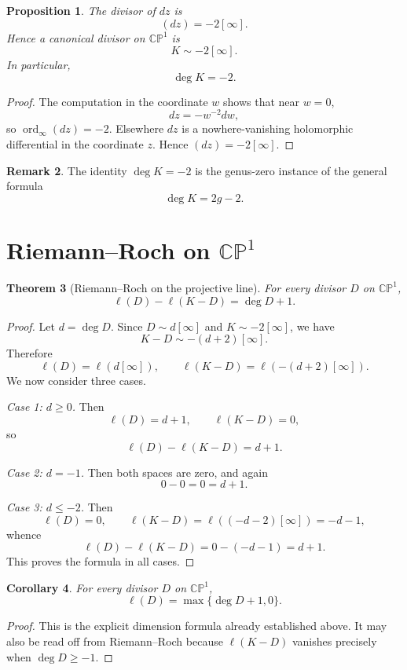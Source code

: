 \documentclass[11pt]{article}
\newcommand{\CP}{\mathbb{CP}}
\newcommand{\ord}{\operatorname{ord}}
\newcommand{\degd}{\operatorname{deg}}
\newcommand{\CPone}{\CP^1}
\newcommand{\ellD}{\ell}
\theoremstyle{plain}
\newtheorem{theorem}{Theorem}[section]
\newtheorem{proposition}[theorem]{Proposition}
\newtheorem{corollary}[theorem]{Corollary}
\theoremstyle{definition}
\newtheorem{remark}[theorem]{Remark}
\begin{document}
\begin{proposition}
The divisor of $dz$ is
\[
(dz)=-2[\infty].
\]
Hence a canonical divisor on $\CPone$ is
\[
K\sim -2[\infty].
\]
In particular,
\[
\degd K=-2.
\]
\end{proposition}

\begin{proof}
The computation in the coordinate $w$ shows that near $w=0$,
\[
dz=-w^{-2}dw,
\]
so $\ord_{\infty}(dz)=-2$. Elsewhere $dz$ is a nowhere-vanishing holomorphic differential in the coordinate $z$. Hence $(dz)=-2[\infty]$.
\end{proof}

\begin{remark}
The identity $\degd K=-2$ is the genus-zero instance of the general formula
\[
\degd K=2g-2.
\]
\end{remark}

\section{Riemann--Roch on \texorpdfstring{$\CPone$}{CP1}}
\begin{theorem}[Riemann--Roch on the projective line]
For every divisor $D$ on $\CPone$,
\[
\ellD(D)-\ellD(K-D)=\degd D+1.
\]
\end{theorem}

\begin{proof}
Let $d=\degd D$. Since $D\sim d[\infty]$ and $K\sim -2[\infty]$, we have
\[
K-D\sim -(d+2)[\infty].
\]
Therefore
\[
\ellD(D)=\ellD(d[\infty]),
\qquad
\ellD(K-D)=\ellD(-(d+2)[\infty]).
\]
We now consider three cases.

\emph{Case 1: $d\ge 0$.} Then
\[
\ellD(D)=d+1,
\qquad
\ellD(K-D)=0,
\]
so
\[
\ellD(D)-\ellD(K-D)=d+1.
\]

\emph{Case 2: $d=-1$.} Then both spaces are zero, and again
\[
0-0=0=d+1.
\]

\emph{Case 3: $d\le -2$.} Then
\[
\ellD(D)=0,
\qquad
\ellD(K-D)=\ellD((-d-2)[\infty])=-d-1,
\]
whence
\[
\ellD(D)-\ellD(K-D)=0-(-d-1)=d+1.
\]
This proves the formula in all cases.
\end{proof}

\begin{corollary}
For every divisor $D$ on $\CPone$,
\[
\ellD(D)=\max\{\degd D+1,0\}.
\]
\end{corollary}

\begin{proof}
This is the explicit dimension formula already established above. It may also be read off from Riemann--Roch because $\ellD(K-D)$ vanishes precisely when $\degd D\ge -1$.
\end{proof}
\end{document}
